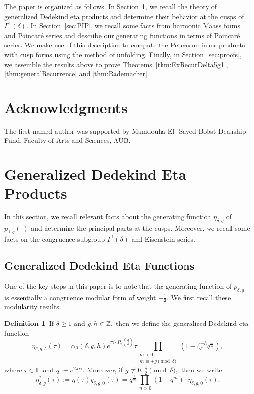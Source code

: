 \documentclass[10pt]{amsart}
\theoremstyle{definition}
\newtheorem*{definition}{Definition}
\theoremstyle{remark}
\numberwithin{equation}{section}
\newcommand{\HH}{\mathbb H}
\newcommand{\Z}{\mathbb Z}
\begin{document}
	The paper is organized as follows. In Section~\ref{sec:GDEP}, we recall the theory of generalized Dedekind eta products and determine their behavior at the cusps of $\Gamma^1(\delta).$ In Section~\ref{sec:PIP}, we recall some facts from harmonic Maass forms and Poincar\'e series and describe our generating functions in terms of Poincar\'e series. We make use of this description to compute the Petersson inner products with cusp forms using the method of unfolding. Finally, in Section~\ref{sec:proofs}, we assemble the results above to prove Theorems~\ref{thm:ExRecurDelta5g1},\ref{thm:generalRecurrence} and \ref{thm:Rademacher}.


	\section*{Acknowledgments}
	
	The first named author was supported by Mamdouha El- Sayed Bobst Deanship Fund, Faculty of Arts and Sciences, AUB.	

	\section{Generalized Dedekind Eta Products}\label{sec:GDEP}
	
	In this section, we recall relevant facts about the generating function $\eta_{\delta,g}$ of $p_{\delta,g}(\cdot)$ and determine the principal parts at the cusps. Moreover, we recall some facts on the congruence subgroup $\Gamma^1(\delta)$ and Eisenstein series.
	
	\subsection{Generalized Dedekind Eta Functions}
	
	One of the key steps in this paper is to note that the generating function of $p_{\delta,g}$ is essentially a congruence modular form of weight $-\frac{1}{2}.$ We first recall these modularity results.
	
	\begin{definition}
		If $\delta\geq 1$ and $g,h\in\Z,$ then we define the generalized Dedekind eta function
		$$
		\eta_{\delta,g,h}(\tau)=\alpha_0(\delta,g,h)e^{\pi i\cdot P_2\left(\frac{g}{\delta}\right)}\tau\prod\limits_{\substack{m > 0 \\ m\equiv \pm g\pmod\delta}}(1-\zeta_\delta^{\pm h}q^{\frac{m}{\delta}}),
		$$
		where $\tau\in\HH$ and $q:=e^{2\pi i\tau}.$ Moreover, if $g\not\equiv 0, \frac{\delta}{2}\pmod\delta,$ then we write 
		$$
		\eta_{\delta,g}^\ast(\tau):=\eta(\tau)\eta_{\delta,g,0}(\tau) = q^{\frac{1}{24}}\prod\limits_{m>0}(1-q^m)\cdot \eta_{\delta,g,0}(\tau).
		$$
	\end{definition}
	
\end{document}
